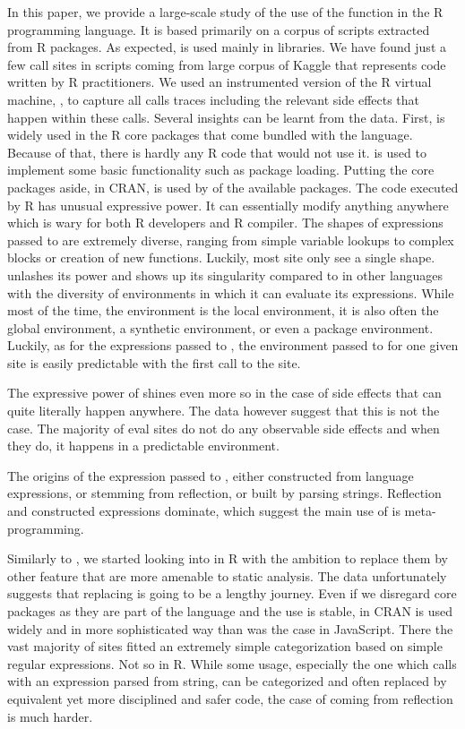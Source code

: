 \documentclass[review,screen,acmsmall,anonymous=true]{acmart}
\begin{document}
In this paper, we provide a large-scale study of the use of the \eval function
in the R programming language. It is based primarily on a corpus of
\CranRunnableScripts scripts extracted from \CranPackages R packages. As
expected, \eval is used mainly in libraries. We have found just a few \eval
call sites in scripts coming from large corpus of Kaggle that represents code
written by R practitioners. We used an instrumented version of the R virtual
machine, \rdyntrace, to capture all \eval calls traces including the relevant
side effects that happen within these calls. Several insights can be learnt
from the data.
%
First, \eval is widely used in the R core packages that come bundled with the
language. Because of that, there is hardly any R code that would not use it.
\eval is used to implement some basic functionality such as package loading.
Putting the core packages aside, in CRAN, \eval is used by \PkgPackagesRatio of
the available \CranPackages packages.
%
The code executed by R \eval has unusual expressive power. It can essentially
modify anything anywhere which is wary for both R developers and R compiler. The shapes of expressions passed to \eval are extremely diverse, ranging from simple variable lookups to complex blocks or creation of new functions. Luckily, most site only see a single shape. \eval unlashes its power and shows up its singularity compared to \eval in other languages with the diversity of environments in which it can evaluate its expressions. While most of the time, the \eval environment is the local environment, it is also often the global environment, a synthetic environment, or even a package environment. Luckily, as for the expressions passed to \eval, the environment passed to \eval for one given site is easily predictable with the first call to the site.

The expressive power of \eval shines even more  so in the case of side effects that can quite literally happen anywhere. The data however suggest that this is not the case. The majority of eval sites do not do any observable side effects and when they do, it happens in a predictable environment.

The origins of the expression passed to \eval, either constructed from language expressions, or stemming from reflection, or built by parsing strings. Reflection and constructed expressions dominate, which suggest the main use of \eval is meta-programming. %

Similarly to \citep{ecoop11}, we started looking into \evals in R with the
ambition to replace them by other feature that are more amenable to static
analysis. The data unfortunately suggests that replacing \eval is going to be
a lengthy journey. Even if we disregard core packages as they are part of the
language and the \eval use is stable, in CRAN \eval is used widely and in more
sophisticated way than was the case in JavaScript. There the vast majority of
sites fitted an extremely simple categorization based on simple regular
expressions. Not so in R. While some usage, especially the one which calls
\eval with an expression parsed from string, can be categorized and often
replaced by equivalent yet more disciplined and safer code, the case of \eval
coming from reflection is much harder. 


\end{document}

